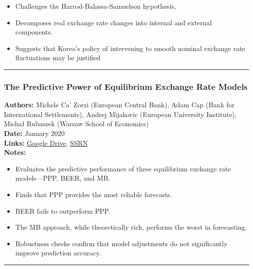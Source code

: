 \documentclass[
  11pt,
]{article}
\providecommand{\tightlist}{%
  \setlength{\itemsep}{0pt}\setlength{\parskip}{0pt}}
\begin{document}
\begin{itemize}
\tightlist
\item
  Challenges the Harrod-Balassa-Samuelson hypothesis,
\item
  Decomposes real exchange rate changes into internal and external
  components.
\item
  Suggests that Korea's policy of intervening to smooth nominal exchange
  rate fluctuations may be justified
\end{itemize}

\begin{center}\rule{0.5\linewidth}{0.5pt}\end{center}

\subsubsection{The Predictive Power of Equilibrium Exchange Rate
Models}\label{the-predictive-power-of-equilibrium-exchange-rate-models}

\textbf{Authors:} Michele Ca' Zorzi (European Central Bank), Adam Cap
(Bank for International Settlements), Andrej Mijakovic (European
University Institute), Michał Rubaszek (Warsaw School of Economics)\\
\textbf{Date:} January 2020\\
\textbf{Links:}
\href{https://drive.google.com/file/d/1XJWcFNb5DNIUlFdC4Kl4DVPB8pWIEm3y/view?usp=sharing}{Google
Drive},
\href{https://papers.ssrn.com/sol3/papers.cfm?abstract_id=3515882}{SSRN}\\
\textbf{Notes:}

\begin{itemize}
\tightlist
\item
  Evaluates the predictive performance of three equilibrium exchange
  rate models---PPP, BEER, and MB.
\item
  Finds that PPP provides the most reliable forecasts.
\item
  BEER fails to outperform PPP.
\item
  The MB approach, while theoretically rich, performs the worst in
  forecasting.
\item
  Robustness checks confirm that model adjustments do not significantly
  improve prediction accuracy.
\end{itemize}

\begin{center}\rule{0.5\linewidth}{0.5pt}\end{center}
\end{document}
